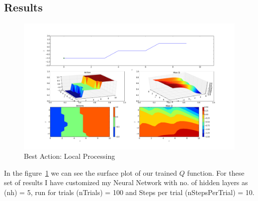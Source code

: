\documentclass{article}
\begin{document}
\subsection{Results}

\begin{figure}[h!]
  \centering
  \includegraphics[width=7in]{RL_NN.png}
  \caption{Best Action: Local Processing}
  \label{fig:RL_NN}
\end{figure}
In the figure~\ref{fig:RL_NN} we can see the surface plot of our trained $Q$ function. For these set of results I have customized my Neural Network with no. of hidden layers as (nh) = 5, run for trials (nTrials) = 100 and Steps per trial (nStepsPerTrial) = 10. \par
\end{document}
